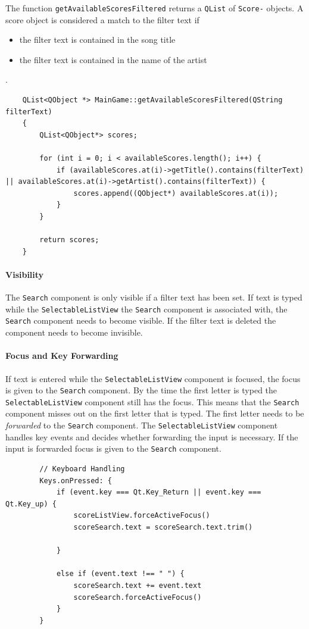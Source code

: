 The \cpp function {\tt getAvailableScoresFiltered} returns a {\tt QList} of {\tt Score-} objects.
A score object is considered a match to the filter text if 
\begin {itemize}
	\item {the filter text is contained in the song title}
	\item {the filter text is contained in the name of the artist}
\end {itemize}.
\begin{lstlisting}
	QList<QObject *> MainGame::getAvailableScoresFiltered(QString filterText)
	{
	    QList<QObject*> scores;
	
	    for (int i = 0; i < availableScores.length(); i++) {
	        if (availableScores.at(i)->getTitle().contains(filterText) || availableScores.at(i)->getArtist().contains(filterText)) {
	            scores.append((QObject*) availableScores.at(i));
	        }
	    }
	
	    return scores;
	}
\end{lstlisting}
\paragraph{Visibility}
The {\tt Search} component is only visible if a filter text has been set. If text is typed while the {\tt SelectableListView} the {\tt Search} component is associated with, the {\tt Search} component needs to become visible. If the filter text is deleted the component needs to become invisible.  
\paragraph{Focus and Key Forwarding}
If text is entered while the {\tt SelectableListView} component is focused, the focus is given to the {\tt Search} component. By the time the first letter is typed the {\tt SelectableListView} component still has the focus. This means that the {\tt Search} component misses out on the first letter that is typed. The first letter needs to be \textit{forwarded} to the {\tt Search} component. The {\tt SelectableListView} component handles key events and decides whether forwarding the input is necessary. If the input is forwarded focus is given to the {\tt Search} component.
\begin{lstlisting}
		// Keyboard Handling
		Keys.onPressed: {
		    if (event.key === Qt.Key_Return || event.key === Qt.Key_up) {
		        scoreListView.forceActiveFocus()
		        scoreSearch.text = scoreSearch.text.trim()
		
		    }
		
		    else if (event.text !== " ") {
		        scoreSearch.text += event.text
		        scoreSearch.forceActiveFocus()
		    }
		}
\end{lstlisting}
